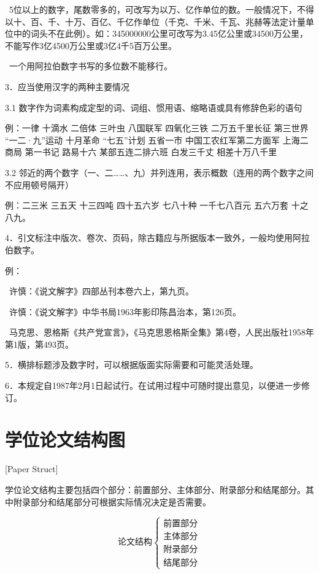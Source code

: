 ~5位以上的数字，尾数零多的，可改写为以万、亿作单位的数。一般情况下，不得以十、百、千、十万、百亿、千亿作单位（千克、千米、千瓦、兆赫等法定计量单位中的词头不在此例）。如：345000000公里可改写为3.45亿公里或34500万公里，不能写作3亿4500万公里或3亿4千5百万公里。

~一个用阿拉伯数字书写的多位数不能移行。

3．应当使用汉字的两种主要情况

3.1  数字作为词素构成定型的词、词组、惯用语、缩略语或具有修辞色彩的语句

例：一律  十滴水  二倍体  三叶虫  八国联军  四氧化三铁  二万五千里长征  第三世界  “一二·九”运动  十月革命  “七五”计划  五省一市  中国工农红军第二方面军  上海二商局 第一书记  路易十六  某部五连二排六班  白发三千丈  相差十万八千里

3.2  邻近的两个数字（一、二……、九）并列连用，表示概数（连用的两个数字之间不应用顿号隔开）

例：二三米  三五天  十三四吨  四十五六岁  七八十种  一千七八百元  五六万套  十之八九。

4．引文标注中版次、卷次、页码，除古籍应与所据版本一致外，一般均使用阿拉伯数字。

例：

~许慎：《说文解字》四部丛刊本卷六上，第九页。

~许慎：《说文解字》中华书局1963年影印陈昌治本，第126页。

~马克思、恩格斯《共产党宣言》，《马克思恩格斯全集》第4卷，人民出版社1958年第1版，第493页。

5．横排标题涉及数字时，可以根据版面实际需要和可能灵活处理。

6．本规定自1987年2月1日起试行。在试用过程中可随时提出意见，以便进一步修订。

\chapter{学位论文结构图}[Paper Struct]

学位论文结构主要包括四个部分：前置部分、主体部分、附录部分和结尾部分。其中附录部分和结尾部分可根据实际情况决定是否需要。

\[
    \text{论文结构}
    \begin{cases}
        \text{前置部分} \\
        \text{主体部分} \\
        \text{附录部分} \\
        \text{结尾部分}
    \end{cases}
\]

